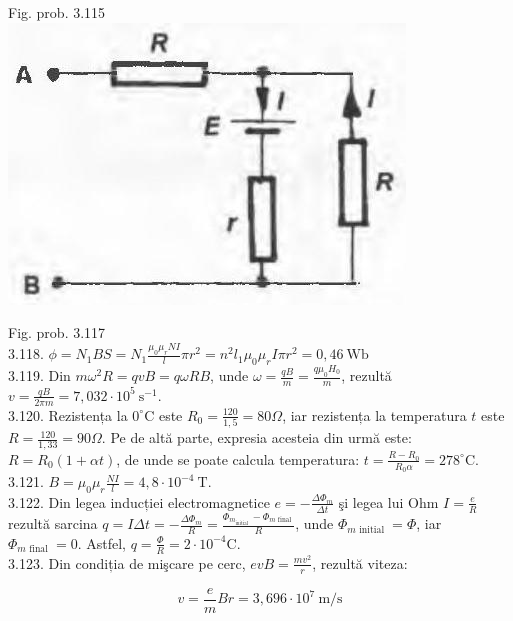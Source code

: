 \documentclass[10pt]{article}
\begin{document}
Fig. prob. 3.115\\
\includegraphics[max width=\textwidth, center]{2025_07_01_5b3ff9fa0d508c8e9f17g-364(1)}

Fig. prob. 3.117\\
3.118. $\phi=N_{1} B S=N_{1} \frac{\mu_{0} \mu_{r} N I}{l} \pi r^{2}=n^{2} l_{1} \mu_{0} \mu_{r} I \pi r^{2}=0,46 \mathrm{~Wb}$\\
3.119. Din $m \omega^{2} R=q v B=q \omega R B$, unde $\omega=\frac{q B}{m}=\frac{q \mu_{0} H_{0}}{m}$, rezultă $v=\frac{q B}{2 \pi m}=7,032 \cdot 10^{5} \mathrm{~s}^{-1}$.\\
3.120. Rezistența la $0^{\circ} \mathrm{C}$ este $R_{0}=\frac{120}{1,5}=80 \Omega$, iar rezistența la temperatura $t$ este $R=\frac{120}{1,33}=90 \Omega$. Pe de altă parte, expresia acesteia din urmă este: $R=R_{0}(1+\alpha t)$, de unde se poate calcula temperatura: $t=\frac{R-R_{0}}{R_{0} \alpha}=278^{\circ} \mathrm{C}$.\\
3.121. $B=\mu_{0} \mu_{r} \frac{N I}{l}=4,8 \cdot 10^{-4} \mathrm{~T}$.\\
3.122. Din legea inducției electromagnetice $e=-\frac{\Delta \Phi_{m}}{\Delta t}$ şi legea lui Ohm $I=\frac{e}{R}$ rezultă sarcina $q=I \Delta t=-\frac{\Delta \Phi_{m}}{R}=\frac{\Phi_{m_{\text {initial }}}-\Phi_{m \text { final }}}{R}$, unde $\Phi_{m \text { initial }}=\Phi$, iar $\Phi_{m \text { final }}=0$. Astfel, $q=\frac{\Phi}{R}=2 \cdot 10^{-4} \mathrm{C}$.\\
3.123. Din condiția de mişcare pe cerc, $e v B=\frac{m v^{2}}{r}$, rezultă viteza:

$$
v=\frac{e}{m} B r=3,696 \cdot 10^{7} \mathrm{~m} / \mathrm{s}
$$
\end{document}
